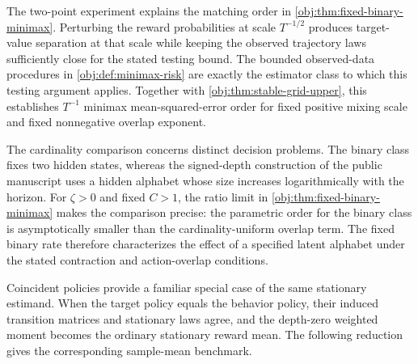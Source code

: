 
The two-point experiment explains the matching order in \cref{obj:thm:fixed-binary-minimax}. Perturbing the reward probabilities at scale \(T^{-1/2}\) produces target-value separation at that scale while keeping the observed trajectory laws sufficiently close for the stated testing bound. The bounded observed-data procedures in \cref{obj:def:minimax-risk} are exactly the estimator class to which this testing argument applies. Together with \cref{obj:thm:stable-grid-upper}, this establishes \(T^{-1}\) minimax mean-squared-error order for fixed positive mixing scale and fixed nonnegative overlap exponent.

The cardinality comparison concerns distinct decision problems. The binary class fixes two hidden states, whereas the signed-depth construction of the public manuscript \citet[Theorem 1 (Uniform overlap frontier) and the Signed-depth family definition]{CausalSmithLatentOverlap2026} uses a hidden alphabet whose size increases logarithmically with the horizon. For \(\zeta>0\) and fixed \(C>1\), the ratio limit in \cref{obj:thm:fixed-binary-minimax} makes the comparison precise: the parametric order for the binary class is asymptotically smaller than the cardinality-uniform overlap term. The fixed binary rate therefore characterizes the effect of a specified latent alphabet under the stated contraction and action-overlap conditions.

Coincident policies provide a familiar special case of the same stationary estimand. When the target policy equals the behavior policy, their induced transition matrices and stationary laws agree, and the depth-zero weighted moment becomes the ordinary stationary reward mean. The following reduction gives the corresponding sample-mean benchmark.


